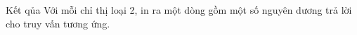 Kết qủa
Với mỗi chỉ thị loại 2, in ra một dòng gồm một số nguyên dương trả lời cho truy vấn tương ứng.